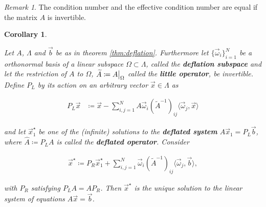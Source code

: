 \documentclass{article}
\newcommand\restr[2]{{%
  \left.\kern-\nulldelimiterspace %
  #1 %
  \vphantom{\big|} %
  \right|_{#2} %
  }
}
\theoremstyle{plain} %
\newtheorem{corollary}[theorem]{Corollary}
\theoremstyle{convention} %
\theoremstyle{remark} %
\newtheorem*{remark}{Remark} %
\def\df#1{\textbf{\textit{#1}}}
\numberwithin{equation}{section}
\begin{document}
\begin{remark}
The condition number and the effective condition number are equal if the matrix $A$ is invertible.
\end{remark}

\begin{corollary}

\label{cor:deflation}

Let $A$, $\Lambda$ and $\vec{b}$ be as in theorem \ref{thm:deflation}. Furthermore let $\{ \vec{\omega}_i \}_{i=1}^N$ be a orthonormal basis of a linear subspace $\Omega \subset \Lambda$, called the \df{deflation subspace} and let the restriction of $A$ to $\Omega$, $\widetilde{A} \coloneqq \restr{A}{\Omega}$ called the \df{little operator}, be invertible. Define $P_L$ by its action on an arbitrary vector $\vec{x} \in \Lambda$ as

\begin{align*}
    P_L \vec{x} &\coloneqq \vec{x} - \sum_{i,j=1}^N A \vec{\omega}_i (\widetilde{A}^{-1})_{ij} \langle \vec{\omega}_j, \vec{x} \rangle
\end{align*}

and let $\vec{x}^{\star}_1$ be one of the (infinite) solutions to the \df{deflated system} $\hat{A} \vec{x}_1 = P_L \vec{b}$, where $\hat{A} \coloneqq P_L A$ is called the \df{deflated operator}. Consider

\begin{align}
    \vec{x}^{\star} \coloneqq P_R \vec{x}^{\star}_1 + \sum_{i,j=1}^N \vec{\omega}_i (\widetilde{A}^{-1})_{ij} \langle \vec{\omega}_j, \vec{b} \rangle, \label{eq:defl_soln}
\end{align}

with $P_R$ satisfying $P_L A = A P_R$. Then $\vec{x}^{\star}$ is the unique solution to the linear system of equations $A \vec{x} = \vec{b}$.

\end{corollary}
\end{document}
